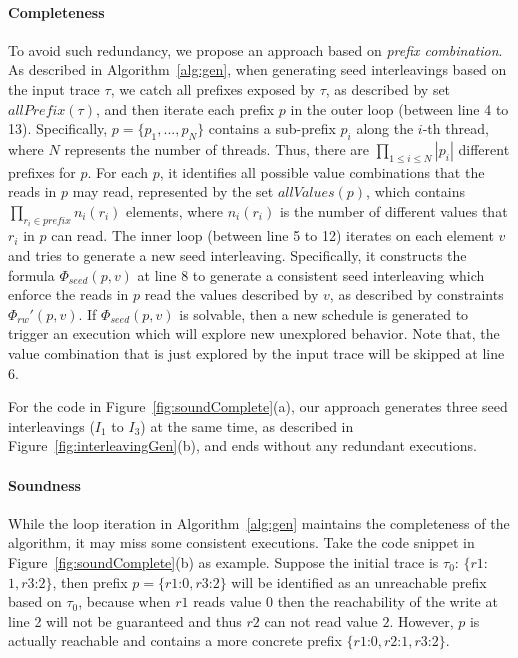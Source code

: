 \documentclass[preprint, numbers, 10pt]{sigplanconf}
\begin{document}
\paragraph{Completeness}
To avoid such redundancy, we propose an approach based on
\textit{prefix combination}. As described in Algorithm~\ref{alg:gen}, when generating seed interleavings based on
the input trace $\tau$, we catch all prefixes exposed by $\tau$, as described by set $allPrefix(\tau)$, and then iterate
each prefix $p$ in the outer loop (between line 4 to 13). 
Specifically, $p=\{p_1,...,p_N\}$ contains a sub-prefix $p_i$ along the $i$-th thread, where $N$ represents 
the number of threads. Thus, there are $\prod_{1\leq i\leq N}|p_i|$ different prefixes for $p$.
For each $p$, it identifies all possible value combinations
that the reads in $p$ may read, represented by the set $allValues(p)$, which contains
$\prod_{r_i\in prefix}n_i(r_i)$ elements, where $n_i(r_i)$ is the number of different values that $r_i$
in $p$ can read. The inner loop (between line 5 to 12) iterates on each element
$v$ and tries to generate a new seed interleaving. 
Specifically, it constructs the formula $\Phi_{seed}(p,v)$ at line 8 to generate a consistent seed interleaving which 
enforce the reads in $p$ read the values described by $v$, as described by constraints $\Phi_{rw}'(p,v)$.
If $\Phi_{seed}(p,v)$ is solvable, then a new schedule is generated to trigger an execution which will explore new unexplored behavior.
Note that, the value combination that is just explored by the input trace will be skipped at line 6. 

For the code in Figure~\ref{fig:soundComplete}(a), our approach generates three seed interleavings ($I_1$ to $I_3$)
at the same time, as described in Figure~\ref{fig:interleavingGen}(b), and ends without any redundant executions.

\paragraph{Soundness}

While the loop iteration in Algorithm~\ref{alg:gen} maintains the completeness of the algorithm, it may miss some
consistent executions. Take the code snippet in Figure~\ref{fig:soundComplete}(b) as example. 
Suppose the initial trace is $\tau_0$: $\{r1$:$1,r3$:$2\}$, then prefix $p=\{r1$:$0,r3$:$2\}$ will be 
identified as an unreachable prefix based on $\tau_0$, because when $r1$ reads value $0$ then the reachability of 
the write at line 2 will not be guaranteed and thus $r2$ can not read value $2$. However, $p$ is actually reachable
and contains a more concrete prefix $\{r1$:$0,r2$:$1,r3$:$2\}$.
\end{document}
